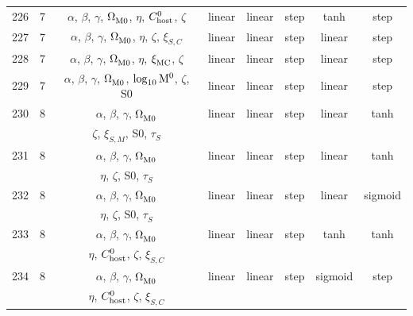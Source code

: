\begin{longtable}{c c c c c c c c}
    226 & 7 & $\alpha$, $\beta$, $\gamma$, $\Omega_{\rm M0}^{}$, $\eta$, $C_{\rm host}^{0}$, $\zeta$ & linear & linear & step & tanh & step \\
    227 & 7 & $\alpha$, $\beta$, $\gamma$, $\Omega_{\rm M0}^{}$, $\eta$, $\zeta$, $\xi_{S,C}^{}$ & linear & linear & step & linear & step \\
    228 & 7 & $\alpha$, $\beta$, $\gamma$, $\Omega_{\rm M0}^{}$, $\eta$, $\xi_{\rm MC}^{}$, $\zeta$ & linear & linear & step & linear & step \\
    229 & 7 & $\alpha$, $\beta$, $\gamma$, $\Omega_{\rm M0}^{}$, $\log_{10}^{}{\rm M}^0$, $\zeta$, S0 & linear & linear & step & linear & step \\
    230 & 8 & $\alpha$, $\beta$, $\gamma$, $\Omega_{\rm M0}^{}$ & linear & linear & step & linear & tanh \\
    \multicolumn{1}{c}{} & \multicolumn{1}{c}{} & $\zeta$, $\xi_{S,M}^{}$, S0, $\tau_S^{}$ & \multicolumn{1}{c}{} & \multicolumn{1}{c}{} & \multicolumn{1}{c}{} & \multicolumn{1}{c}{} & \multicolumn{1}{c}{} \\
    231 & 8 & $\alpha$, $\beta$, $\gamma$, $\Omega_{\rm M0}^{}$ & linear & linear & step & linear & tanh \\
    \multicolumn{1}{c}{} & \multicolumn{1}{c}{} & $\eta$, $\zeta$, S0, $\tau_S^{}$ & \multicolumn{1}{c}{} & \multicolumn{1}{c}{} & \multicolumn{1}{c}{} & \multicolumn{1}{c}{} & \multicolumn{1}{c}{} \\
    232 & 8 & $\alpha$, $\beta$, $\gamma$, $\Omega_{\rm M0}^{}$ & linear & linear & step & linear & sigmoid \\
    \multicolumn{1}{c}{} & \multicolumn{1}{c}{} & $\eta$, $\zeta$, S0, $\tau_S^{}$ & \multicolumn{1}{c}{} & \multicolumn{1}{c}{} & \multicolumn{1}{c}{} & \multicolumn{1}{c}{} & \multicolumn{1}{c}{} \\
    233 & 8 & $\alpha$, $\beta$, $\gamma$, $\Omega_{\rm M0}^{}$ & linear & linear & step & tanh & tanh \\
    \multicolumn{1}{c}{} & \multicolumn{1}{c}{} & $\eta$, $C_{\rm host}^{0}$, $\zeta$, $\xi_{S,C}^{}$ & \multicolumn{1}{c}{} & \multicolumn{1}{c}{} & \multicolumn{1}{c}{} & \multicolumn{1}{c}{} & \multicolumn{1}{c}{} \\
    234 & 8 & $\alpha$, $\beta$, $\gamma$, $\Omega_{\rm M0}^{}$ & linear & linear & step & sigmoid & step \\
    \multicolumn{1}{c}{} & \multicolumn{1}{c}{} & $\eta$, $C_{\rm host}^{0}$, $\zeta$, $\xi_{S,C}^{}$ & \multicolumn{1}{c}{} & \multicolumn{1}{c}{} & \multicolumn{1}{c}{} & \multicolumn{1}{c}{} & \multicolumn{1}{c}{} \\

\end{longtable}
